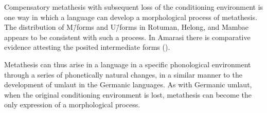 \begin{exe}\let\eachwordone=\textnormal
	\label{ex:pure>puer}
\end{exe}

Compensatory metathesis with subsequent loss of the conditioning environment is
one way in which a language can develop a morphological process of metathesis.
The distribution of M\=/forms and U\=/forms in Rotuman, Helong, and Mambae
appears to be consistent with such a process.
In Amarasi there is comparative evidence attesting the posited
intermediate forms ().

Metathesis can thus arise in a language in a specific phonological environment
through a series of phonetically natural changes,
in a similar manner to the development of umlaut in the Germanic languages.
As with Germanic umlaut, when the original conditioning environment is lost,
metathesis can become the only expression of a morphological process.
